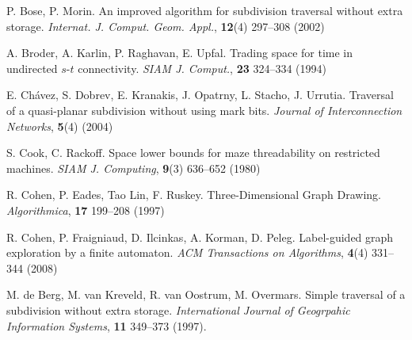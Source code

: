 \documentclass[12pt,letterpaper,oneside]{book}
\begin{document}
\begin{thebibliography}{9}
 P. Bose, P. Morin.  An improved algorithm for subdivision traversal without extra storage.  
\emph{Internat. J. Comput. Geom. Appl.}, \textbf{12}(4) 297--308 (2002)



 A. Broder, A. Karlin, P. Raghavan, E. Upfal.  Trading space for time in undirected $s$-$t$ connectivity.  
\emph{SIAM J. Comput.}, \textbf{23} 324--334 (1994)  


 E. Ch\'{a}vez, S. Dobrev, E. Kranakis, J. Opatrny, L. Stacho, J. Urrutia. 
Traversal of a quasi-planar subdivision without using mark bits.  \emph{Journal of Interconnection Networks}, 
\textbf{5}(4) (2004)

 S. Cook, C. Rackoff.  Space lower bounds for maze threadability on restricted machines.  
\emph{SIAM J. Computing}, 
\textbf{9}(3) 636--652 (1980)   

 R. Cohen, P. Eades, Tao Lin, F. Ruskey.  Three-Dimensional Graph Drawing.  \emph{Algorithmica}, 
\textbf{17} 199--208 (1997)


 R. Cohen, P. Fraigniaud, D. Ilcinkas, A. Korman, D. Peleg.  Label-guided graph exploration 
by a finite automaton.  \emph{ACM Transactions on Algorithms}, \textbf{4}(4) 331--344 (2008)  %

 M. de Berg, M. van Kreveld, R. van Oostrum, M. Overmars.  Simple traversal of a subdivision 
without extra storage.  \emph{International Journal of Geogrpahic Information Systems}, \textbf{11} 349--373 (1997).




\end{thebibliography}
\end{document}
